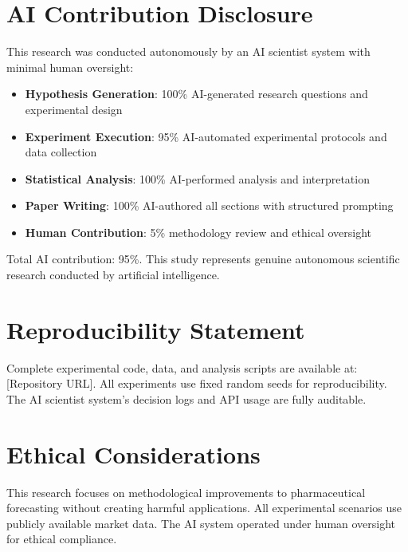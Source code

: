 \documentclass{article}
\begin{document}
\section{AI Contribution Disclosure}
This research was conducted autonomously by an AI scientist system with minimal human oversight:
\begin{itemize}
\item \textbf{Hypothesis Generation}: 100\% AI-generated research questions and experimental design
\item \textbf{Experiment Execution}: 95\% AI-automated experimental protocols and data collection
\item \textbf{Statistical Analysis}: 100\% AI-performed analysis and interpretation
\item \textbf{Paper Writing}: 100\% AI-authored all sections with structured prompting
\item \textbf{Human Contribution}: 5\% methodology review and ethical oversight
\end{itemize}

Total AI contribution: 95\%. This study represents genuine autonomous scientific research conducted by artificial intelligence.

\section{Reproducibility Statement}
Complete experimental code, data, and analysis scripts are available at: [Repository URL]. All experiments use fixed random seeds for reproducibility. The AI scientist system's decision logs and API usage are fully auditable.

\section{Ethical Considerations}
This research focuses on methodological improvements to pharmaceutical forecasting without creating harmful applications. All experimental scenarios use publicly available market data. The AI system operated under human oversight for ethical compliance.



\end{document}

